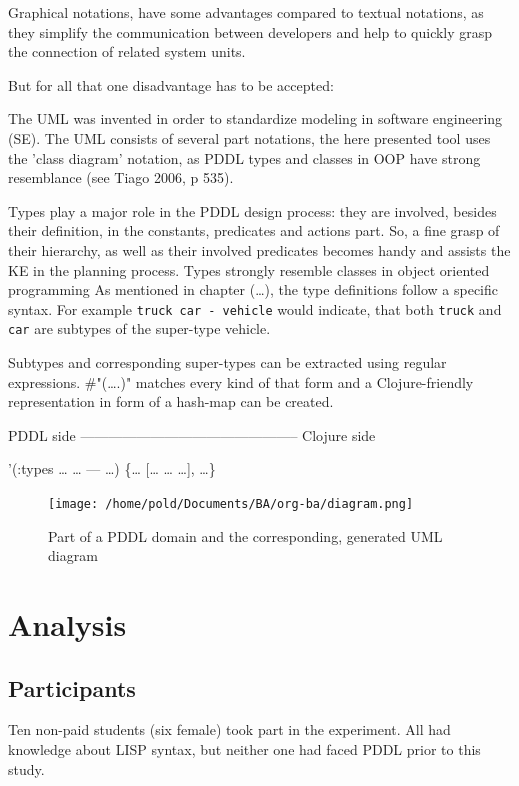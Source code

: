 \documentclass[11pt]{report}
\begin{document}
Graphical notations, have some advantages compared to textual
notations, as they simplify the communication between developers and
help to quickly grasp the connection of related system units. 

But for all that one disadvantage has to be accepted: 

The UML was invented in order to standardize modeling in software
engineering (SE). The UML consists of several part notations, the here
presented tool uses the 'class diagram' notation, as PDDL types and
classes in OOP have strong resemblance (see Tiago 2006, p 535). 

Types play a major role in the PDDL design process: they are involved,
besides their definition, in the constants, predicates and actions
part. So, a fine grasp of their hierarchy, as well as their involved
predicates becomes handy and assists the KE in the planning process.
Types strongly resemble classes in object oriented programming
As mentioned in chapter (\ldots{}), the type definitions follow a specific
syntax. For example \verb~truck car - vehicle~ would indicate, that both
\verb~truck~ and \verb~car~ are subtypes of the super-type vehicle. 

Subtypes and corresponding super-types can be extracted using regular
expressions. \#"(\ldots{}.)" matches every kind of that form and a
Clojure-friendly representation in form of a hash-map can be created.

PDDL side ----------------------------------------------- Clojure side

'(:types \ldots{} \ldots{} --- \ldots{})                      \{\ldots{} [\ldots{} \ldots{} \ldots{}], \ldots{}\}

\begin{figure}[htb]
\centering
\texttt{[image: /home/pold/Documents/BA/org-ba/diagram.png]}
\caption{Part of a PDDL domain and the corresponding, generated UML diagram}
\end{figure}

\chapter{Analysis}
\label{sec-5}
\section{Participants}
\label{sec-5-1}
Ten non-paid students (six female) took part in the experiment. All
had knowledge about LISP syntax, but neither one had faced PDDL prior
to this study. 
\end{document}
